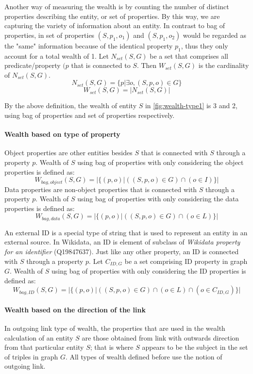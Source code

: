 Another way of measuring the wealth is by counting the number of distinct properties describing the entity, or set of properties. By this way, we are capturing the variety of information about an entity. In contrast to bag of properties, in set of properties \((S, p_1, o_1)\) and \((S, p_1, o_2)\) would be regarded as the "same" information because of the identical property \(p_1\), thus they only account for a total wealth of 1. Let \(N_{set}(S,G)\) be a set that comprises all predicate/property \((p\) that is connected to \(S\). Then \(W_{set}(S, G)\) is the cardinality of \(N_{set}(S,G)\).
\[
    N_{set}(S, G) = \{p | \exists o, (S, p, o) \in G\}
\]
\[
    W_{set}(S, G) = |N_{set}(S,G)|
\]

By the above definition, the wealth of entity \(S\) in \autoref{fig:wealth-type1} is 3 and 2, using bag of properties and set of properties respectively.

\paragraph{Wealth based on type of property}
Object properties are other entities besides \(S\) that is connected with \(S\) through a property \(p\). Wealth of \(S\) using bag of properties with only considering the object properties is defined as:
\[
    W_{bag, object}(S, G) = |\{(p,o) | ((S, p, o) \in G) \cap (o \in I)\}|
\]
Data properties are non-object properties that is connected with \(S\) through a property \(p\). Wealth of \(S\) using bag of properties with only considering the data properties is defined as:
\[
    W_{bag, data}(S, G) = |\{(p,o) | ((S, p, o) \in G) \cap (o \in L)\}|
\]

An external ID is a special type of string that is used to represent an entity in an external source. In Wikidata, an ID is element of subclass of \textit{Wikidata property for an identifier} (Q19847637). Just like any other property, an ID is connected with \(S\) through a property \(p\). Let  \(C_{ID,G}\) be a set comprising ID property in graph \(G\). Wealth of \(S\) using bag of properties with only considering the ID properties is defined as:
\[
    W_{bag, ID}(S, G) = |\{(p,o) | ((S, p, o) \in G) \cap (o \in L) \cap (o \in C_{ID,G})\}|
\]

\paragraph{Wealth based on the direction of the link}
In outgoing link type of wealth, the properties that are used in the wealth calculation of an entity \(S\) are those obtained from link with outwards direction from that particular entity \(S\); that is where \(S\) appears to be the subject in the set of triples in graph \(G\). All types of wealth defined before use the notion of outgoing link.

